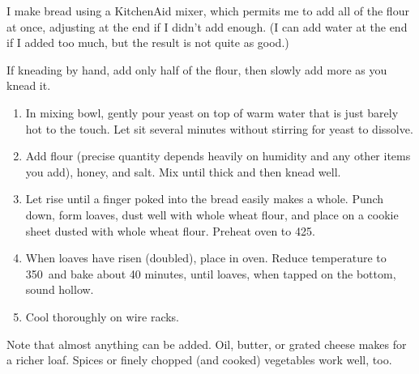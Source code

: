 
\begin{ingredients}
\end{ingredients}


I make bread using a KitchenAid mixer, which permits me to add all of
the flour at once, adjusting at the end if I didn't add enough.  (I
can add water at the end if I added too much, but the result is not
quite as good.)

If kneading by hand, add only half of the flour, then slowly add more
as you knead it.


\begin{recipe}
  \begin{enumerate}

  \item In mixing bowl, gently pour yeast on top of warm water that is
    just barely hot to the touch.  Let sit several minutes without
    stirring for yeast to dissolve.

  \item Add flour (precise quantity depends heavily on humidity and
    any other items you add), honey, and salt.  Mix until thick and
    then knead well.

  \item Let rise until a finger poked into the bread easily makes a
    whole.  Punch down, form loaves, dust well with whole wheat flour,
    and place on a cookie sheet dusted with whole wheat flour.
    Preheat oven to 425\F.

  \item When loaves have risen (doubled), place in oven.  Reduce
    temperature to 350\F\ and bake about 40 minutes, until loaves, when
    tapped on the bottom, sound hollow.

  \item Cool thoroughly on wire racks.

  \end{enumerate}

  Note that almost anything can be added.  Oil, butter, or grated
  cheese makes for a richer loaf.  Spices or finely chopped (and
  cooked) vegetables work well, too.

\end{recipe}
